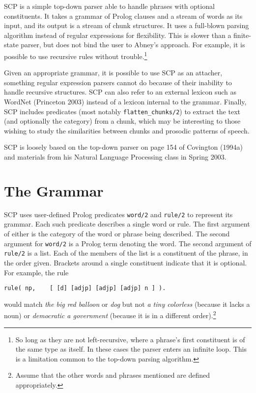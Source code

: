 \documentclass[12pt]{article}
\begin{document}
SCP is a simple top-down parser able to handle phrases with optional constituents.  It takes a grammar of Prolog clauses and a stream of words as its input, and its output is a stream of chunk structures.  It uses a full-blown parsing algorithm instead of regular expressions for flexibility.  This is slower than a finite-state parser, but does not bind the user to Abney's approach.  For example, it is possible to use recursive rules without trouble.\footnote{So long as they are not left-recursive, where a phrase's first constituent is of the same type as itself. In these cases the parser enters an infinite loop.  This is a limitation common to the top-down parsing algorithm.}

Given an appropriate grammar, it is possible to use SCP as an attacher, something regular expression parsers cannot do because of their inability to handle recursive structures.  SCP can also refer to an external lexicon such as WordNet (Princeton 2003) instead of a lexicon internal to the grammar.  Finally, SCP includes predicates (most notably \verb+flatten_chunks/2+) to extract the text (and optionally the category) from a chunk, which may be interesting to those wishing to study the similarities between chunks and prosodic patterns of speech.

SCP is loosely based on the top-down parser on page 154 of Covington (1994a) and materials from his Natural Language Processing class in Spring 2003.

\section{The Grammar}

SCP uses user-defined Prolog predicates \verb+word/2+ and \verb+rule/2+ to represent its grammar.  Each such predicate describes a single word or rule.  The first argument of either is the category of the word or phrase being described.  The second argument for \verb+word/2+ is a Prolog term denoting the word.  The second argument of \verb+rule/2+ is a list.  Each of the members of the list is a constituent of the phrase, in the order given.  Brackets around a single constituent indicate that it is optional.  For example, the rule
\begin{verbatim}
rule( np,    [ [d] [adjp] [adjp] [adjp] n ] ).
\end{verbatim}
would match \emph{the big red balloon} or \emph{dog} but not \emph{a tiny colorless} (because it lacks a noun) or \emph{democratic a government} (because it is in a different order).\footnote{Assume that the other words and phrases mentioned are defined appropriately.}
\end{document}
